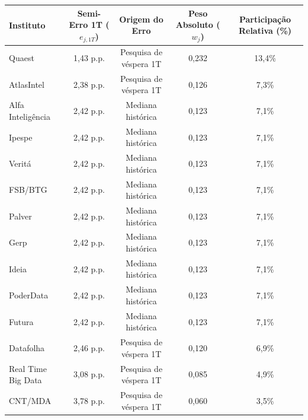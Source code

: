 \begin{tabular}{lcccc}
\toprule
\textbf{Instituto} & \textbf{Semi-Erro 1T ($e_{j,1T}$)} & \textbf{Origem do Erro} & \textbf{Peso Absoluto ($w_j$)} & \textbf{Participação Relativa (\%)} \\
\midrule
Quaest & 1,43 p.p. & Pesquisa de véspera 1T & 0,232 & 13,4\% \\
AtlasIntel & 2,38 p.p. & Pesquisa de véspera 1T & 0,126 & 7,3\% \\
Alfa Inteligência & 2,42 p.p. & Mediana histórica & 0,123 & 7,1\% \\
Ipespe & 2,42 p.p. & Mediana histórica & 0,123 & 7,1\% \\
Veritá & 2,42 p.p. & Mediana histórica & 0,123 & 7,1\% \\
FSB/BTG & 2,42 p.p. & Mediana histórica & 0,123 & 7,1\% \\
Palver & 2,42 p.p. & Mediana histórica & 0,123 & 7,1\% \\
Gerp & 2,42 p.p. & Mediana histórica & 0,123 & 7,1\% \\
Ideia & 2,42 p.p. & Mediana histórica & 0,123 & 7,1\% \\
PoderData & 2,42 p.p. & Mediana histórica & 0,123 & 7,1\% \\
Futura & 2,42 p.p. & Mediana histórica & 0,123 & 7,1\% \\
Datafolha & 2,46 p.p. & Pesquisa de véspera 1T & 0,120 & 6,9\% \\
Real Time Big Data & 3,08 p.p. & Pesquisa de véspera 1T & 0,085 & 4,9\% \\
CNT/MDA & 3,78 p.p. & Pesquisa de véspera 1T & 0,060 & 3,5\% \\
\bottomrule
\end{tabular}
